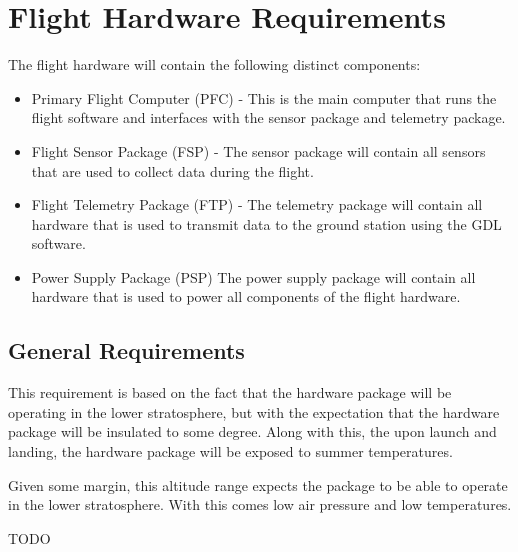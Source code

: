 \section{Flight Hardware Requirements}

The flight hardware will contain the following distinct components:
\begin{itemize}
  \item Primary Flight Computer (PFC) -
    This is the main computer that runs the flight software and interfaces with the sensor package and telemetry package.
  \item Flight Sensor Package (FSP) -
    The sensor package will contain all sensors that are used to collect data during the flight.
  \item Flight Telemetry Package (FTP) -
    The telemetry package will contain all hardware that is used to transmit data to the ground station using the GDL software.
  \item Power Supply Package (PSP)
    The power supply package will contain all hardware that is used to power all components of the flight hardware.
\end{itemize}


\subsection{General Requirements}

This requirement is based on the fact that the hardware package will be operating in the lower stratosphere, but with the expectation that the hardware package will be insulated to some degree. Along with this, the upon launch and landing, the hardware package will be exposed to summer temperatures.


Given some margin, this altitude range expects the package to be able to operate in the lower stratosphere. With this comes low air pressure and low temperatures.


TODO


